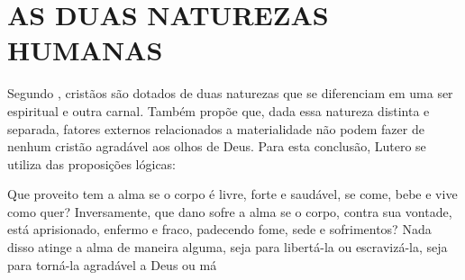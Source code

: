 \documentclass[
    article,            %
	12pt,				%
	oneside,			%
	a4paper,			%
	chapter=TITLE,		%
	section=TITLE,		%
	english,			%
	french,				%
	spanish,			%
	brazil				%
	]{abntex2}
\begin{document}



\imprimircapa

\imprimirfolhaderosto


\textual
\pagestyle{simple}


\section*{AS DUAS NATUREZAS HUMANAS}


Segundo , cristãos são dotados de duas naturezas que se diferenciam em uma ser espiritual e outra carnal. Também propõe que, dada essa natureza distinta e separada, fatores externos relacionados a materialidade não podem fazer de nenhum cristão agradável aos olhos de Deus. Para esta conclusão, Lutero se utiliza das proposições lógicas:
\begin{citacao}
Que proveito tem a alma se o corpo é livre, forte e saudável, se come, bebe e vive como quer? Inversamente, que dano sofre a alma se o corpo, contra sua vontade, está aprisionado, enfermo e fraco, padecendo fome, sede e sofrimentos? Nada disso atinge a alma de maneira alguma, seja para libertá-la ou escravizá-la, seja para torná-la agradável a Deus ou má \cite{LUTERO}
\end{citacao}

\pagebreak
\renewcommand{\bibname}{{REFER\^ENCIAS}}

\end{document}
